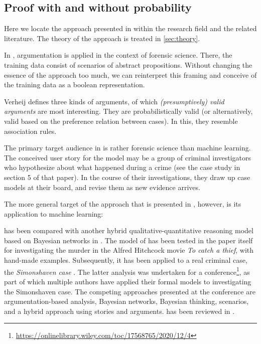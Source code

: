  

\subsection{Proof with and without probability}\label{without}

Here we locate the approach presented in \citet{verheijProofProbabilities2017} within the research field and the related literature. The theory of the approach is treated in \autoref{sec:theory}.

In \cite{verheijProofProbabilities2017}, argumentation is applied in the context of forensic science. There, the training data consist of scenarios of abstract propositions. Without changing the essence of the approach too much, we can reinterpret this framing and conceive of the training data as a boolean representation.

Verheij defines three kinds of arguments, of which \textit{(presumptively) valid arguments} are most interesting. They are probabilistically valid (or alternatively, valid based on the preference relation between cases). In this, they resemble association rules. 

The primary target audience in \cite{verheijProofProbabilities2017} is rather forensic science than machine learning. The conceived user story for the model may be a group of criminal investigators who hypothesize about what happened during a crime (see the case study in section 5 of that paper). In the course of their investigations, they draw up case models at their board, and revise them as new evidence arrives. 

The more general target of the approach that is presented in \cite{verheijProofProbabilities2017}, however, is its application to machine learning:  \citep[p.~66]{verheijArgumentsGoodArtificial2018}

\cite{verheijProofProbabilities2017} has been compared with another hybrid qualitative-quantitative reasoning model based on Bayesian networks in \citet{vanleeuwenComparisonTwoHybrid2019}. The model of \cite{verheijProofProbabilities2017} has been tested in the paper itself for investigating the murder in the Alfred Hitchcock movie \textit{To catch a thief}, with hand-made examples. Subsequently, it has been applied to a real criminal case, the \textit{Simonshaven case} \cite{verheijAnalyzingSimonshavenCase2020}. The latter analysis was undertaken for a conference\footnote{\url{https://onlinelibrary.wiley.com/toc/17568765/2020/12/4}}, as part of which multiple authors have applied their formal models to investigating the Simonshaven case. The competing approaches presented at the conference are argumentation-based analysis, Bayesian networks, Bayesian thinking, scenarios, and a hybrid approach using stories and arguments. \citet{verheijAnalyzingSimonshavenCase2020} has been reviewed in \cite{zenkerStoriesviaArgumentsScenarios2020}.

